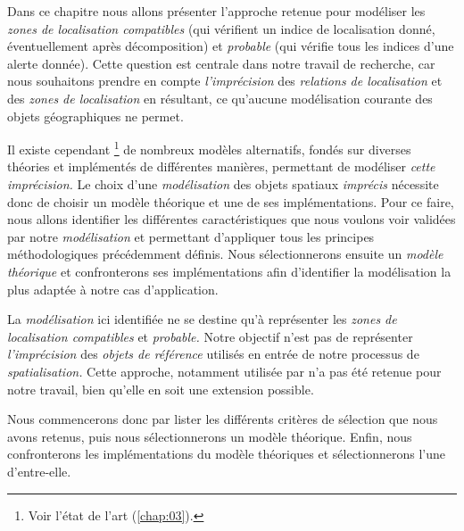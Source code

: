 Dans ce chapitre nous allons présenter l'approche retenue pour
modéliser les \emph{zones de localisation compatibles} (\ie qui
vérifient un indice de localisation donné, éventuellement après
décomposition) et \emph{probable} (qui vérifie tous les indices d'une
alerte donnée). Cette question est centrale dans notre travail de
recherche, car nous souhaitons prendre en compte \emph{l'imprécision}
des \emph{relations de localisation} et des \emph{zones de
  localisation} en résultant, ce qu'aucune modélisation courante des
objets géographiques ne permet.

Il existe cependant \footnote{Voir l'état de l'art
  (\autoref{chap:03}).} de nombreux modèles alternatifs, fondés sur
diverses théories et implémentés de différentes manières, permettant
de modéliser \emph{cette imprécision.} Le choix d'une
\emph{modélisation} des objets spatiaux \emph{imprécis} nécessite donc
de choisir un modèle théorique et une de ses implémentations. Pour ce
faire, nous allons identifier les différentes caractéristiques que
nous voulons voir validées par notre \emph{modélisation} et permettant
d'appliquer tous les principes méthodologiques précédemment
définis. Nous sélectionnerons ensuite un \emph{modèle théorique} et
confronterons ses implémentations afin d'identifier la modélisation la
plus adaptée à notre cas d’application.

La \emph{modélisation} ici identifiée ne se destine qu'à représenter
les \emph{zones de localisation compatibles} et \emph{probable.}
Notre objectif n'est pas de représenter \emph{l'imprécision} des
\emph{objets de référence} utilisés en entrée de notre processus de
\emph{spatialisation.} Cette approche, notamment utilisée par
\textcite{Bloch1996} n'a pas été retenue pour notre travail, bien
qu'elle en soit une extension possible.

Nous commencerons donc par lister les différents critères de sélection
que nous avons retenus, puis nous sélectionnerons un modèle
théorique. Enfin, nous confronterons les implémentations du modèle
théoriques et sélectionnerons l'une d'entre-elle.

